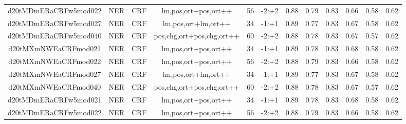 \documentclass[a4paper]{article}
\begin{document}
\begin{landscape}
\begin{center}
\begin{tabular}{ |c|c|c|c|c|c|c|c|c|c|c|c|}
 
 	
 	\small{ d20tMDmERaCRFw5mod022 } & \small{ NER} & \small{  CRF }  & lm,pos,ort+pos,ort++  &  56 &  \small{  -2:+2 }  &  0.88 & 0.79 & 0.83  &  0.66 & 0.58 & 0.62 \\
 	

 
 	
 	\small{ d20tMDmERaCRFw5mod027 } & \small{ NER} & \small{  CRF }  & lm,pos,ort+lm,ort++  &  34 &  \small{  -1:+1 }  &  0.89 & 0.77 & 0.83  &  0.67 & 0.58 & 0.62 \\
 	

 
 	
 	\small{ d20tMDmERaCRFw5mod040 } & \small{ NER} & \small{  CRF }  & pos,chg,ort+pos,chg,ort++  &  60 &  \small{  -2:+2 }  &  0.88 & 0.78 & 0.83  &  0.67 & 0.57 & 0.62 \\
 	

 
 	
 	\small{ d20tMXmNWEaCRFmod021 } & \small{ NER} & \small{  CRF }  & lm,pos,ort+pos,ort++  &  34 &  \small{  -1:+1 }  &  0.89 & 0.78 & 0.83  &  0.68 & 0.58 & 0.62 \\
 	

 
 	
 	\small{ d20tMXmNWEaCRFmod022 } & \small{ NER} & \small{  CRF }  & lm,pos,ort+pos,ort++  &  56 &  \small{  -2:+2 }  &  0.88 & 0.79 & 0.83  &  0.66 & 0.58 & 0.62 \\
 	

 
 	
 	\small{ d20tMXmNWEaCRFmod027 } & \small{ NER} & \small{  CRF }  & lm,pos,ort+lm,ort++  &  34 &  \small{  -1:+1 }  &  0.89 & 0.77 & 0.83  &  0.67 & 0.58 & 0.62 \\
 	

 
 	
 	\small{ d20tMXmNWEaCRFmod040 } & \small{ NER} & \small{  CRF }  & pos,chg,ort+pos,chg,ort++  &  60 &  \small{  -2:+2 }  &  0.88 & 0.78 & 0.83  &  0.67 & 0.57 & 0.62 \\
 	

 
 	
 	\small{ d20tMDmERaCRFw5mod021 } & \small{ NER} & \small{  CRF }  & lm,pos,ort+pos,ort++  &  34 &  \small{  -1:+1 }  &  0.89 & 0.78 & 0.83  &  0.68 & 0.58 & 0.62 \\
 	

 
 	
 	\small{ d20tMDmERaCRFw5mod022 } & \small{ NER} & \small{  CRF }  & lm,pos,ort+pos,ort++  &  56 &  \small{  -2:+2 }  &  0.88 & 0.79 & 0.83  &  0.66 & 0.58 & 0.62 \\
 	


\end{tabular}
\end{center}
\end{landscape}
\end{document}
